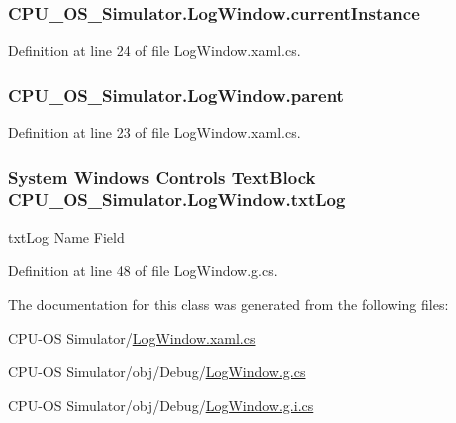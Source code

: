 \subsubsection[{current\+Instance}]{ C\+P\+U\+\_\+\+O\+S\+\_\+\+Simulator.\+Log\+Window.\+current\+Instance\hspace{0.3cm}{\ttfamily [static]}}\label{class_c_p_u___o_s___simulator_1_1_log_window_ae888c936335930faf46e6a121b0a34ac}


Definition at line 24 of file Log\+Window.\+xaml.\+cs.

\hypertarget{class_c_p_u___o_s___simulator_1_1_log_window_a72c3ad97eb5e6551a174ddf92961aecb}{}
\subsubsection[{parent}]{ C\+P\+U\+\_\+\+O\+S\+\_\+\+Simulator.\+Log\+Window.\+parent\hspace{0.3cm}{\ttfamily [private]}}\label{class_c_p_u___o_s___simulator_1_1_log_window_a72c3ad97eb5e6551a174ddf92961aecb}


Definition at line 23 of file Log\+Window.\+xaml.\+cs.

\hypertarget{class_c_p_u___o_s___simulator_1_1_log_window_adf5b9516057f4453c1646bc12982d979}{}
\subsubsection[{txt\+Log}]{\setlength{\rightskip}{0pt plus 5cm}System Windows Controls Text\+Block C\+P\+U\+\_\+\+O\+S\+\_\+\+Simulator.\+Log\+Window.\+txt\+Log}\label{class_c_p_u___o_s___simulator_1_1_log_window_adf5b9516057f4453c1646bc12982d979}


txt\+Log Name Field 



Definition at line 48 of file Log\+Window.\+g.\+cs.



The documentation for this class was generated from the following files\+:\begin{DoxyCompactItemize}
\item 
C\+P\+U-\/\+O\+S Simulator/\hyperlink{_log_window_8xaml_8cs}{Log\+Window.\+xaml.\+cs}\item 
C\+P\+U-\/\+O\+S Simulator/obj/\+Debug/\hyperlink{_log_window_8g_8cs}{Log\+Window.\+g.\+cs}\item 
C\+P\+U-\/\+O\+S Simulator/obj/\+Debug/\hyperlink{_log_window_8g_8i_8cs}{Log\+Window.\+g.\+i.\+cs}\end{DoxyCompactItemize}
